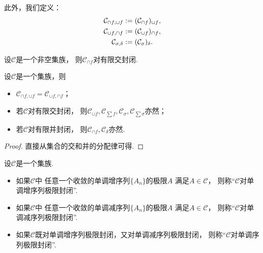 此外，我们定义：\begin{gather*}
	\mathcal{C}_{\cap f,\cup f}
	:=
	(\mathcal{C}_{\cap f})_{\cup f}, \\
	\mathcal{C}_{\cup f,\cap f}
	:=
	(\mathcal{C}_{\cup f})_{\cap f}, \\
	\mathcal{C}_{\sigma,\delta}
	:=
	(\mathcal{C}_\sigma)_\delta.
\end{gather*}

\begin{proposition}
设\(\mathcal{C}\)是一个非空集族，
则\(\mathcal{C}_{\cap f}\)对有限交封闭.
\end{proposition}

\begin{proposition}
设\(\mathcal{C}\)是一个集族，则\begin{itemize}
	\item \(\mathcal{C}_{\cap f,\cup f} = \mathcal{C}_{\cup f,\cap f}\)；
	\item 若\(\mathcal{C}\)对有限交封闭，
	则\(\mathcal{C}_{\cup f},
	\mathcal{C}_{\sum f},
	\mathcal{C}_\sigma,
	\mathcal{C}_{\sum \sigma}\)亦然；
	\item 若\(\mathcal{C}\)对有限并封闭，
	则\(\mathcal{C}_{\cap f},
	\mathcal{C}_\delta\)亦然.
\end{itemize}
\begin{proof}
直接从集合的交和并的分配律可得.
\end{proof}
\end{proposition}

\begin{definition}
设\(\mathcal{C}\)是一个集族.
\begin{itemize}
	\item 如果\(\mathcal{C}\)中
	任意一个收敛的单调增序列\(\{A_n\}\)的极限\(A\)
	满足\(A\in\mathcal{C}\)，
	则称“\(\mathcal{C}\)对单调增序列极限封闭”.
	\item 如果\(\mathcal{C}\)中
	任意一个收敛的单调减序列\(\{A_n\}\)的极限\(A\)
	满足\(A\in\mathcal{C}\)，
	则称“\(\mathcal{C}\)对单调减序列极限封闭”.
	\item 如果\(\mathcal{C}\)既对单调增序列极限封闭，又对单调减序列极限封闭，
	则称“\(\mathcal{C}\)对单调序列极限封闭”.
\end{itemize}
\end{definition}

